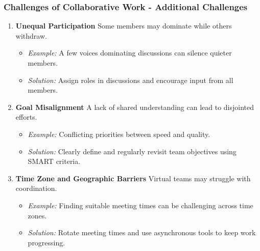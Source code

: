 \documentclass[aspectratio=169]{beamer}
\begin{document}
\begin{frame}[fragile]
  \frametitle{Challenges of Collaborative Work - Additional Challenges}
  \begin{enumerate}[resume]
    \item \textbf{Unequal Participation}  
      Some members may dominate while others withdraw.
      \begin{itemize}
        \item \textit{Example:} A few voices dominating discussions can silence quieter members.
        \item \textit{Solution:} Assign roles in discussions and encourage input from all members.
      \end{itemize}

    \item \textbf{Goal Misalignment}  
      A lack of shared understanding can lead to disjointed efforts.
      \begin{itemize}
        \item \textit{Example:} Conflicting priorities between speed and quality.
        \item \textit{Solution:} Clearly define and regularly revisit team objectives using SMART criteria.
      \end{itemize}

    \item \textbf{Time Zone and Geographic Barriers}  
      Virtual teams may struggle with coordination.
      \begin{itemize}
        \item \textit{Example:} Finding suitable meeting times can be challenging across time zones.
        \item \textit{Solution:} Rotate meeting times and use asynchronous tools to keep work progressing.
      \end{itemize}
  \end{enumerate}
\end{frame}
\end{document}
